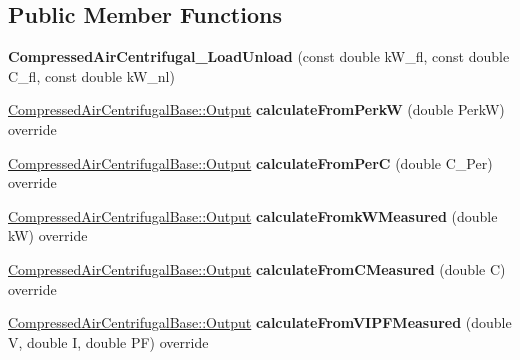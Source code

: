 \subsection*{Public Member Functions}
\begin{DoxyCompactItemize}
\item 
\mbox{\label{class_compressed_air_centrifugal___load_unload_ad01a5b7853ae89956c664669c8baf326}} 
{\bfseries Compressed\+Air\+Centrifugal\+\_\+\+Load\+Unload} (const double k\+W\+\_\+fl, const double C\+\_\+fl, const double k\+W\+\_\+nl)
\item 
\mbox{\label{class_compressed_air_centrifugal___load_unload_a62fec8e3d2ba6f493f3efde9108682d6}} 
\hyperlink{struct_compressed_air_centrifugal_base_1_1_output}{Compressed\+Air\+Centrifugal\+Base\+::\+Output} {\bfseries calculate\+From\+PerkW} (double PerkW) override
\item 
\mbox{\label{class_compressed_air_centrifugal___load_unload_a486691c41c8d377e79a20861663f7c47}} 
\hyperlink{struct_compressed_air_centrifugal_base_1_1_output}{Compressed\+Air\+Centrifugal\+Base\+::\+Output} {\bfseries calculate\+From\+PerC} (double C\+\_\+\+Per) override
\item 
\mbox{\label{class_compressed_air_centrifugal___load_unload_ab1193c3fc5623fdd60c0daaabb42baab}} 
\hyperlink{struct_compressed_air_centrifugal_base_1_1_output}{Compressed\+Air\+Centrifugal\+Base\+::\+Output} {\bfseries calculate\+Fromk\+W\+Measured} (double kW) override
\item 
\mbox{\label{class_compressed_air_centrifugal___load_unload_a9409220efb012288c3a6f73ebd943078}} 
\hyperlink{struct_compressed_air_centrifugal_base_1_1_output}{Compressed\+Air\+Centrifugal\+Base\+::\+Output} {\bfseries calculate\+From\+C\+Measured} (double C) override
\item 
\mbox{\label{class_compressed_air_centrifugal___load_unload_a854152f7ac59eb1c0b4681a3ca65edb7}} 
\hyperlink{struct_compressed_air_centrifugal_base_1_1_output}{Compressed\+Air\+Centrifugal\+Base\+::\+Output} {\bfseries calculate\+From\+V\+I\+P\+F\+Measured} (double V, double I, double PF) override

\end{DoxyCompactItemize}

